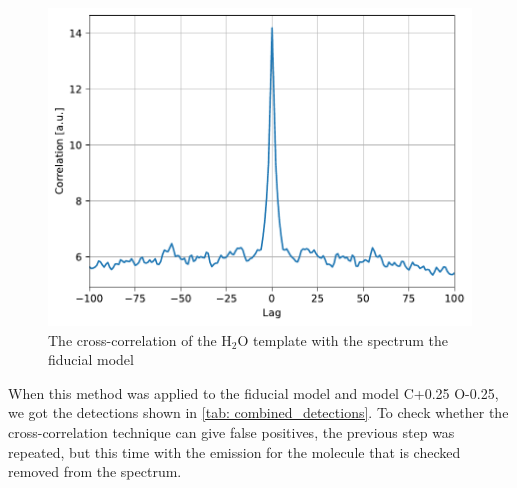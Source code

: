 \documentclass[twoside, single, authoryear, semicolon, 12pt]{lion-msc}
\newcommand{\4}{$_4$}
\newcommand{\3}{$_3$}
\newcommand{\2}{$_2$}
\begin{document}
\begin{figure}[H]
    \centering
    \includegraphics[width=.6\linewidth]{Figures/Cross-Correlation.pdf}
    \caption{The cross-correlation of the H\2O template with the spectrum the fiducial model}
    \label{fig: crosscorr}
\end{figure}

When this method was applied to the fiducial model and model C+0.25 O-0.25, we got the detections shown in \autoref{tab: combined_detections}. To check whether the cross-correlation technique can give false positives, the previous step was repeated, but this time with the emission for the molecule that is checked removed from the spectrum.

\begin{table}[!ht]
\centering
{}
\caption{Molecular detections in the spectrum of the fiducial model (A) and the model with C+0.25 and O-0.25 (B) before and after subtracting molecular emission. A confirmed detection () indicates that the molecule is detected in the full spectrum. A molecular emission is considered present in the full spectrum when the integrated flux over the wavelength range is greater than the integrated flux of a flat continuum at 0.1 mJy over the wavelength range.}
\label{tab: combined_detections}
\end{table}
\end{document}
